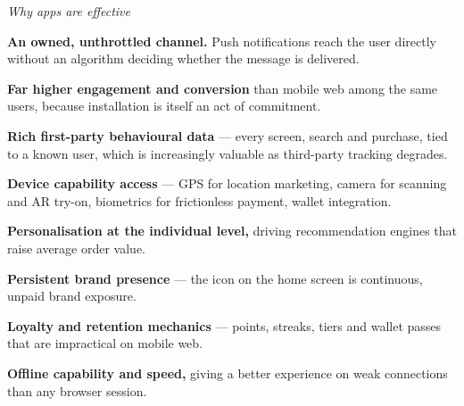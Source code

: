 \begin{qlist}
\textit{Why apps are effective}
\begin{apts}
\item \textbf{An owned, unthrottled channel.} Push notifications reach the user
      directly without an algorithm deciding whether the message is delivered.
\item \textbf{Far higher engagement and conversion} than mobile web among the
      same users, because installation is itself an act of commitment.
\item \textbf{Rich first-party behavioural data} --- every screen, search and
      purchase, tied to a known user, which is increasingly valuable as
      third-party tracking degrades.
\item \textbf{Device capability access} --- GPS for location marketing, camera
      for scanning and AR try-on, biometrics for frictionless payment, wallet
      integration.
\item \textbf{Personalisation at the individual level,} driving recommendation
      engines that raise average order value.
\item \textbf{Persistent brand presence} --- the icon on the home screen is
      continuous, unpaid brand exposure.
\item \textbf{Loyalty and retention mechanics} --- points, streaks, tiers and
      wallet passes that are impractical on mobile web.
\item \textbf{Offline capability and speed,} giving a better experience on weak
      connections than any browser session.
\end{apts}


\end{qlist}
